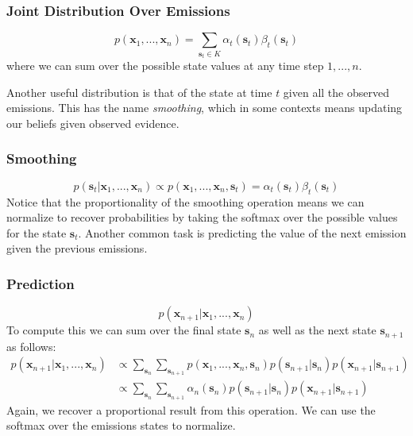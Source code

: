 \subsubsection{Joint Distribution Over Emissions}
\begin{equation} \label{joint-fn}
	p(\textbf{x}_1, ..., \textbf{x}_n) = \sum_{\textbf{s}_t \in K} \alpha_t(\textbf{s}_t) \beta_t(\textbf{s}_t)
\end{equation}
where we can sum over the possible state values at any time step $1,...,n$.

Another useful distribution is that of the state at time $t$ given all the observed emissions. This has the name \textit{smoothing}, which in some contexts means updating our beliefs given observed evidence.

\subsubsection{Smoothing}
\begin{equation} \label{smoothing-fn}
	p(\textbf{s}_t | \textbf{x}_1, ..., \textbf{x}_n) \propto p(\textbf{x}_1, ..., \textbf{x}_n, \textbf{s}_t) = \alpha_t(\textbf{s}_t) \beta_t(\textbf{s}_t)
\end{equation}
Notice that the proportionality of the smoothing operation means we can normalize to recover probabilities by taking the softmax over the possible values for the state $\textbf{s}_t$. \newline \newline
Another common task is predicting the value of the next emission given the previous emissions.

\subsubsection{Prediction}
\begin{equation} \label{prediction-fn}
	p(\textbf{x}_{n+1} | \textbf{x}_1, ..., \textbf{x}_n)
\end{equation}
To compute this we can sum over the final state $\textbf{s}_n$ as well as the next state $\textbf{s}_{n+1}$ as follows:
\begin{align}
	p(\textbf{x}_{n+1} | \textbf{x}_1, ..., \textbf{x}_n) &\propto \sum_{\textbf{s}_n} \sum_{\textbf{s}_{n+1}} p(\textbf{x}_1, ..., \textbf{x}_n, \textbf{s}_n) p(\textbf{s}_{n+1} | \textbf{s}_n) p(\textbf{x}_{n+1} | \textbf{s}_{n+1}) \\
	&\propto \sum_{\textbf{s}_n} \sum_{\textbf{s}_{n+1}} \alpha_{n}(\textbf{s}_n) p(\textbf{s}_{n+1} | \textbf{s}_n) p(\textbf{x}_{n+1} | \textbf{s}_{n+1})
\end{align}
Again, we recover a proportional result from this operation. We can use the softmax over the emissions states to normalize.

